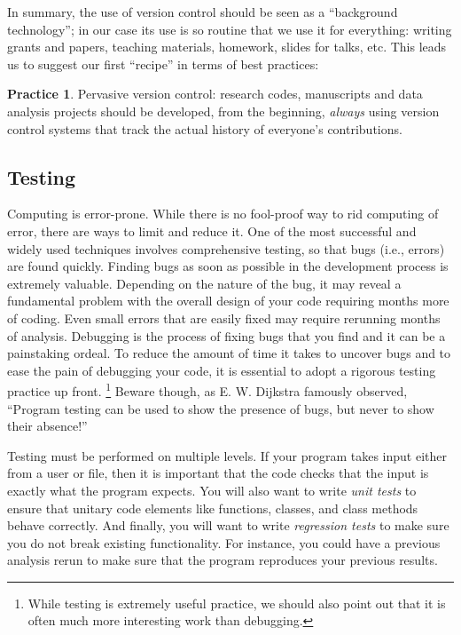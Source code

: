 \documentclass[ChapterTOCs,krantz2]{krantz} %
\theoremstyle{definition}
\newtheorem{practice}{Practice}
\begin{document}
In summary, the use of version control should be seen as a ``background
technology''; in our case its use is so routine that we use it for everything:
writing grants and papers, teaching materials, homework, slides for talks, etc.
This leads us to suggest our first ``recipe'' in terms of best practices:

\begin{practice}
  Pervasive version control: research codes, manuscripts and data analysis
  projects should be developed, from the beginning, \emph{always} using version
  control systems that track the actual history of everyone's contributions.
\end{practice}

\subsection{Testing}

Computing is error-prone. While there is no
fool-proof way to rid computing of error, there are ways to limit and reduce
it. One of the most successful and widely used techniques involves
comprehensive testing, so that bugs (i.e., errors) are found quickly. Finding
bugs as soon as possible in the development process is extremely valuable.
Depending on the nature of the bug, it may reveal a fundamental problem with
the overall design of your code requiring months more of coding.  Even small
errors that are easily fixed may require rerunning months of analysis.
Debugging is the process of fixing bugs that you find and it can be a
painstaking ordeal. To reduce the amount of time it takes to uncover bugs and
to ease the pain of debugging your code, it is essential to adopt a rigorous
testing practice up front.%
\footnote{While testing is extremely useful
practice, we should also point out that it is often much more interesting work
than debugging.} Beware though, as E. W. Dijkstra famously observed, ``Program
testing can be used to show the presence of bugs, but never to show their
absence!'' \cite{dahl1972structured}

Testing must be performed on multiple levels. If your program takes input
either from a user or file, then it is important that the code checks that the
input is exactly what the program expects. You will also want to write
\emph{unit tests} to ensure that unitary code elements like functions, classes,
and class methods behave correctly. And finally, you will want to write
\emph{regression tests} to make sure you do not break existing functionality.
For instance, you could have a previous analysis rerun to make sure that the
program reproduces your previous results.
\end{document}
